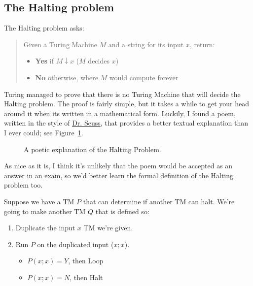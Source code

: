 \subsection{The Halting problem}

The Halting problem asks:

\begin{quote}
  Given a Turing Machine $M$ and a string for its input $x$, return:
  \begin{itemize}
    \item[] \textbf{Yes} if $M \downarrow x$ ($M$ decides $x$)
    \item[] \textbf{No} otherwise, where $M$ would compute forever
  \end{itemize}
\end{quote}

Turing managed to prove that there is no Turing Machine that will decide the
Halting problem. The proof is fairly simple, but it takes a while to get your
head around it when its written in a mathematical form. Luckily, I found a poem,
written in the style of \href{https://en.wikipedia.org/wiki/Dr._Seuss}{Dr.
Seuss}, that provides a better textual explanation than I ever could; see
Figure~\ref{fig:halting-poem}.

\begin{figure}[h]
\begin{minipage}{\textwidth}
  \begin{mymulticols}
  
  \end{mymulticols}
  \restoregeometry
\end{minipage}
\caption{A poetic explanation of the Halting Problem.}
\label{fig:halting-poem}
\end{figure}

As nice as it is, I think it's unlikely that the poem would be accepted as an
answer in an exam, so we'd better learn the formal definition of the Halting
problem too.

Suppose we have a TM $P$ that can determine if another TM can halt. We're going
to make another TM $Q$ that is defined so:

\begin{enumerate}
  \item Duplicate the input $x$ TM we're given.
  \item Run $P$ on the duplicated input ($x;x$).
  \begin{itemize}
    \item[] $P(x;x) = Y$, then Loop 
    \item[] $P(x;x) = N$, then Halt
  \end{itemize}
\end{enumerate}

